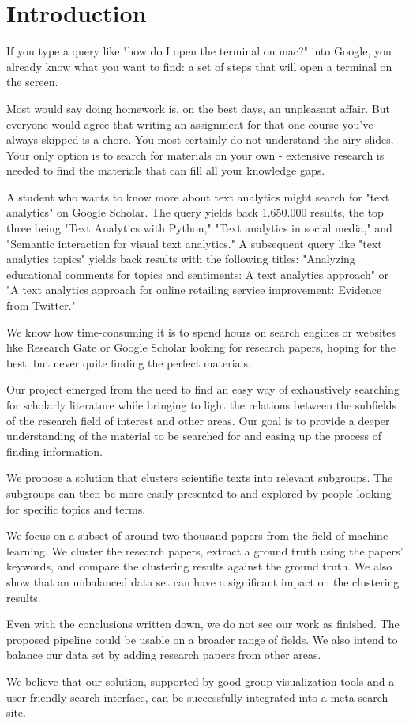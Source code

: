 \section{Introduction}

If you type a query like "how do I open the terminal on mac?" into Google, you already know what you want to find: a set of steps that will open a terminal on the screen.

Most would say doing homework is, on the best days, an unpleasant affair. But everyone would agree that writing an assignment for that one course you've always skipped is a chore. You most certainly do not understand the airy slides. Your only option is to search for materials on your own - extensive research is needed to find the materials that can fill all your knowledge gaps.

A student who wants to know more about text analytics might search for "text analytics" on Google Scholar. The query yields back 1.650.000 results, the top three being "Text Analytics with Python," "Text analytics in social media," and "Semantic interaction for visual text analytics." A subsequent query like "text analytics topics" yields back results with the following titles: "Analyzing educational comments for topics and sentiments: A text analytics approach" or "A text analytics approach for online retailing service improvement: Evidence from Twitter."

We know how time-consuming it is to spend hours on search engines or websites like Research Gate or Google Scholar looking for research papers, hoping for the best, but never quite finding the perfect materials.

Our project emerged from the need to find an easy way of exhaustively searching for scholarly literature while bringing to light the relations between the subfields of the research field of interest and other areas. Our goal is to provide a deeper understanding of the material to be searched for and easing up the process of finding information.

We propose a solution that clusters scientific texts into relevant subgroups. The subgroups can then be more easily presented to and explored by people looking for specific topics and terms.

We focus on a subset of around two thousand papers from the field of machine learning. We cluster the research papers, extract a ground truth using the papers' keywords, and compare the clustering results against the ground truth. We also show that an unbalanced data set can have a significant impact on the clustering results. 

Even with the conclusions written down, we do not see our work as finished. The proposed pipeline could be usable on a broader range of fields. We also intend to balance our data set by adding research papers from other areas.

We believe that our solution, supported by good group visualization tools and a user-friendly search interface, can be successfully integrated into a meta-search site.